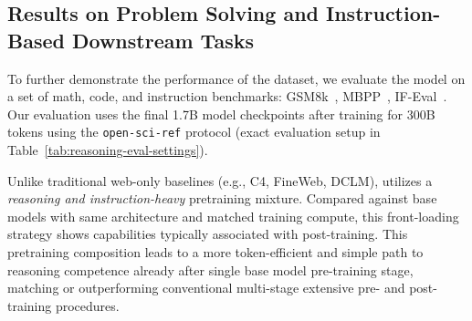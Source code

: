     


\subsection{Results on Problem Solving and Instruction-Based Downstream Tasks}
\label{sec:instruct_results}

To further demonstrate the performance of the \MixtureVitae{} dataset, we evaluate the model on a set of math, code, and instruction benchmarks: GSM8k~\citep{cobbe2021training}, MBPP~\citep{austin2021programsynthesislargelanguagen}, IF-Eval~\citep{zhou2023instruction}.  Our evaluation uses the final 1.7B model checkpoints after training for 300B tokens using the \texttt{open-sci-ref} protocol (exact evaluation setup in Table~\ref{tab:reasoning-eval-settings}).

Unlike traditional web-only baselines (e.g., C4, FineWeb, DCLM), \MixtureVitae{} utilizes a \textit{reasoning and instruction-heavy} pretraining mixture. Compared against base models with same architecture and matched training compute, this front-loading strategy shows capabilities typically associated with post-training. This pretraining composition leads to a more token-efficient and simple path to reasoning competence already after single base model pre-training stage, matching or outperforming conventional multi-stage extensive pre- and post-training procedures.



